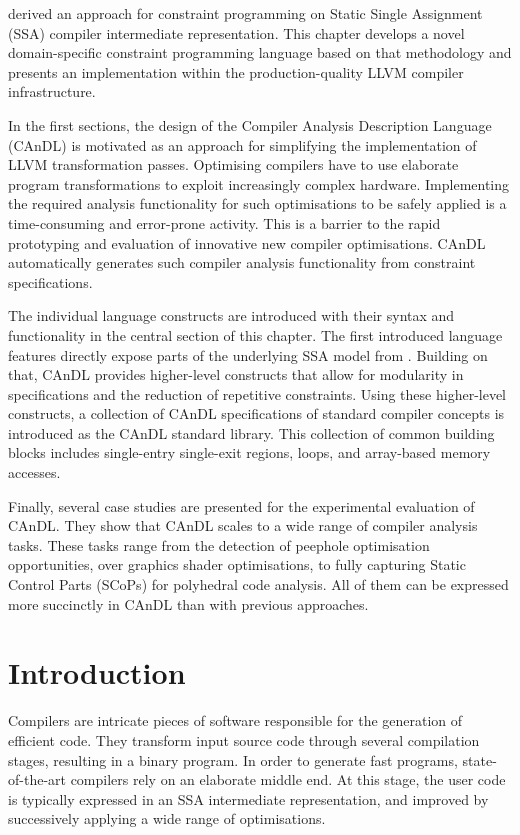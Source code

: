 
     derived an approach for constraint programming on
    Static Single Assignment (SSA) compiler intermediate representation.
    This chapter develops a novel domain-specific constraint programming
    language based on that methodology and presents an implementation within the
    production-quality LLVM compiler infrastructure.

    In the first sections, the design of the Compiler Analysis
    Description Language (CAnDL) is motivated as an approach for simplifying
    the implementation of LLVM transformation passes.
    Optimising compilers have to use elaborate program transformations to
    exploit increasingly complex hardware.
    Implementing the required analysis functionality for such optimisations to
    be safely applied is a time-consuming and error-prone activity.
    This is a barrier to the rapid prototyping and evaluation of innovative new
    compiler optimisations.
    CAnDL automatically generates such compiler analysis functionality from
    constraint specifications.

    The individual language constructs are introduced with their syntax and
    functionality in the central section of this chapter.
    The first introduced language features directly expose parts of the
    underlying SSA model from .
    Building on that, CAnDL provides higher-level constructs that allow for
    modularity in specifications and the reduction of repetitive constraints.
    Using these higher-level constructs, a collection of CAnDL specifications
    of standard compiler concepts is introduced as the CAnDL standard library.
    This collection of common building blocks includes single-entry single-exit
    regions, loops, and array-based memory accesses.

    Finally, several case studies are presented for the experimental evaluation
    of CAnDL.
    They show that CAnDL scales to a wide range of compiler analysis tasks.
    These tasks range from the detection of peephole optimisation opportunities,
    over graphics shader optimisations, to fully capturing Static Control Parts
    (SCoPs) for polyhedral code analysis.
    All of them can be expressed more succinctly in CAnDL than with previous
    approaches.

\section{Introduction}

    Compilers are intricate pieces of software responsible for the generation of
    efficient code.
    They transform input source code through several compilation stages,
    resulting in a binary program.
    In order to generate fast programs, state-of-the-art compilers rely on an
    elaborate middle end.
    At this stage, the user code is typically expressed in an SSA intermediate
    representation, and improved by successively applying a wide range of
    optimisations.

